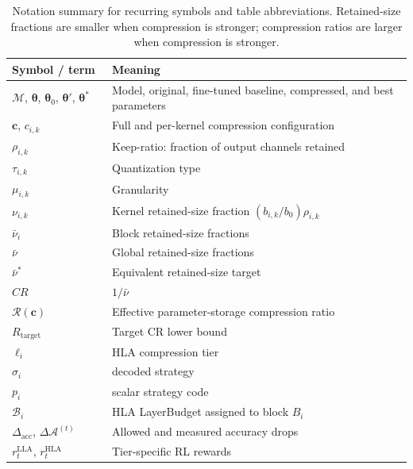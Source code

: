 \documentclass[preprint,12pt,authoryear]{elsarticle}
\begin{document}
\begin{table}[htbp]
    \caption{Notation summary for recurring symbols and table abbreviations. Retained-size fractions are smaller when compression is stronger; compression ratios are larger when compression is stronger.}
    \label{tab:notation}
    \begin{center}
        \begin{tabular}{p{0.25\linewidth}p{0.75\linewidth}}
            \toprule
            \textbf{Symbol / term} & \textbf{Meaning} \\
            \midrule
            $\mathcal{M}$, $\boldsymbol{\theta}$, $\boldsymbol{\theta}_0$, $\boldsymbol{\theta}'$, $\boldsymbol{\theta}^*$ & Model, original, fine-tuned baseline, compressed, and best parameters  \\
            $\mathbf{c}$, $c_{i,k}$ & Full and per-kernel compression configuration  \\
            $\rho_{i,k}$ & Keep-ratio: fraction of output channels retained  \\
            $\tau_{i,k}$ & Quantization type \\ 
            $\mu_{i,k}$ & Granularity \\
            $\nu_{i,k}$ & Kernel retained-size fraction $(b_{i,k}/b_0)\rho_{i,k}$ \\
            $\bar{\nu}_i$ & Block retained-size fractions \\
            $\bar{\nu}$ & Global retained-size fractions \\ 
            $\bar{\nu}^*$ & Equivalent retained-size target \\
            $CR$ & $1/\bar{\nu}$ \\
            $\mathcal{R}(\mathbf{c})$ & Effective parameter-storage compression ratio \\
            $R_{\mathrm{target}}$ & Target CR lower bound  \\
            $\ell_i$  & HLA compression tier \\
            $\sigma_i$ & decoded strategy \\
            $p_i$ & scalar strategy code \\
            $\mathcal{B}_i$ & HLA LayerBudget assigned to block $B_i$ \\
            $\Delta_{\mathrm{acc}}$, $\Delta\mathcal{A}^{(t)}$ & Allowed and measured accuracy drops \\
            $r_t^{\mathrm{LLA}}$, $r_t^{\mathrm{HLA}}$ & Tier-specific RL rewards \\

\end{tabular}
\end{center}
\end{table}
\end{document}
